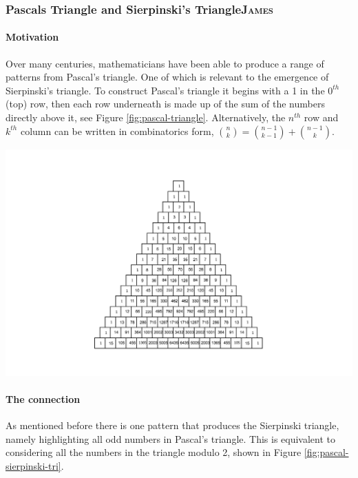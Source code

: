 \documentclass[a4paper,11pt,twoside]{article}
\begin{document}
\subsubsection{Pascals Triangle and Sierpinski's Triangle\hfill{}\textsc{James}}
\label{pascal-sierpinski}
\paragraph{Motivation}
\label{sec:org9e3629a}
Over many centuries, mathematicians have been able to produce a range of patterns from Pascal's triangle. One of which is relevant to the emergence of Sierpinski's triangle. To construct Pascal's triangle it begins with a 1 in the \(0^{th}\) (top) row, then each row underneath is made up of the sum of the numbers directly above it, see Figure \ref{fig:pascal-triangle}. Alternatively, the \(n^{th}\) row and \(k^{th}\) column can be written in combinatorics form, \(\binom{n}{k} = \binom{n-1}{k-1} + \binom{n-1}{k}\).

\begin{center}
\includegraphics[width=.9\linewidth]{media/tikz/pascals-triangle.png}
\end{center}

\paragraph{The connection}
\label{sec:org57cb9db}
As mentioned before there is one pattern that produces the Sierpinski triangle, namely highlighting all odd numbers in Pascal's triangle. This is equivalent to considering all the numbers in the triangle modulo 2, shown in Figure \ref{fig:pascal-sierpinski-tri}.
\end{document}
